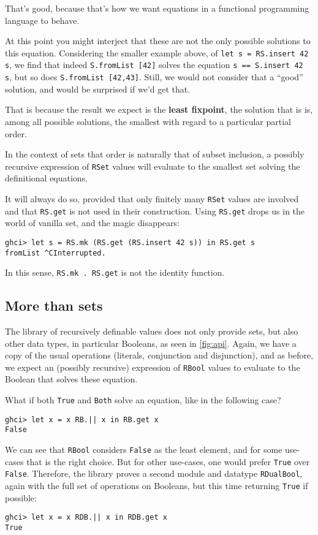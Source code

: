 \documentclass[manuscript,screen,acmsmall]{acmart}
\begin{document}
That’s good, because that’s how we want equations in a functional programming language to behave.

At this point you might interject that these are not the only possible solutions to this equation. Considering the smaller example above, of \verb|let s = RS.insert 42 s|, we find that indeed \verb|S.fromList [42]| solves the equation \verb|s == S.insert 42 s|, but so does \verb|S.fromList [42,43]|. Still, we would not consider that a “good” solution, and would be surprised if we'd get that.

That is because the result we expect is the \textbf{least fixpoint}, the solution that is is, among all possible solutions, the smallest with regard to a particular partial order.

In the context of sets that order is naturally that of subset inclusion, a possibly recursive expression of \verb|RSet| values will evaluate to the smallest set solving the definitional equations.

It will always do so, provided that only finitely many \verb|RSet| values are involved and that \verb|RS.get| is not used in their construction. Using \verb|RS.get| drops us in the world of vanilla set, and the magic disappears:
\begin{verbatim}
ghci> let s = RS.mk (RS.get (RS.insert 42 s)) in RS.get s
fromList ^CInterrupted.
\end{verbatim}
In this sense, \verb|RS.mk . RS.get| is not the identity function.

\subsection{More than sets}

The library of recursively definable values does not only provide sets, but also other data types, in particular Booleans, as seen in \cref{fig:api}. Again, we have a copy of the usual operations (literals, conjunction and disjunction), and as before, we expect an (possibly recursive) expression of \verb|RBool| values to evaluate to the Boolean that solves these equation.

What if both \verb|True| and \verb|Both| solve an equation, like in the following case?
\begin{verbatim}
ghci> let x = x RB.|| x in RB.get x
False
\end{verbatim}
We can see that \verb|RBool| considers \verb|False| as the least element, and for some use-cases that is the right choice. But for other use-cases, one would prefer \verb|True| over \verb|False|. Therefore, the library proves a second module and datatype \verb|RDualBool|, again with the full set of operations on Booleans, but this time returning \verb|True| if possible:
\begin{verbatim}
ghci> let x = x RDB.|| x in RDB.get x
True
\end{verbatim}
\end{document}
